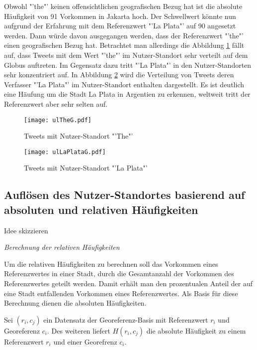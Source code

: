 			Obwohl "'the"' keinen offensichtlichen geografischen Bezug hat ist die absolute Häufigkeit von 91 Vorkommen in Jakarta hoch.
			Der Schwellwert könnte nun aufgrund der Erfahrung mit dem Referenzwert "'La Plata"' auf 90 angesetzt werden.
			Dann würde davon ausgegangen werden, dass der Referenzwert "'the"' einen geografischen Bezug hat.
			Betrachtet man allerdings die Abbildung \ref{img:ULThe} fällt auf, dass Tweets mit dem Wert "'the"' im Nutzer-Standort sehr verteilt auf dem Globus auftreten.
			Im Gegensatz dazu tritt "'La Plata"' in den Nutzer-Standorten sehr konzentriert auf.
			In Abbildung \ref{img:ULlaPlata} wird die Verteilung von Tweets deren Verfasser "'La Plata"' im Nutzer-Standort enthalten dargestellt. 
			Es ist deutlich eine Häufung um die Stadt La Plata in Argentien zu erkennen, weltweit tritt der Referenzwert aber sehr selten auf.
			\begin{figure} 
				\begin{center}
					\texttt{[image: ulTheG.pdf]}
					\caption{Tweets mit Nutzer-Standort "'The"'}
					\label{img:ULThe}
					\end{center}
				\end{figure}
			\begin{figure}
			\begin{center}
					\texttt{[image: ulLaPlataG.pdf]}
					\caption{Tweets mit Nutzer-Standort "'La Plata"'}
					\label{img:ULlaPlata}
				\end{center}
			\end{figure}		

		\subsection{Auflösen des Nutzer-Standortes basierend auf absoluten und relativen Häufigkeiten} 

			Idee skizzieren

			\textit{Berechnung der relativen Häufigkeiten}  

				Um die relativen Häufigkeiten zu berechnen soll das Vorkommen eines Referenzwertes in einer Stadt, durch die Gesamtanzahl der Vorkommen des Referenzwertes geteilt werden.
				Damit erhält man den prozentualen Anteil der auf eine Stadt entfallenden Vorkommen eines Referenzwertes.
				Als Basis für diese Berechnung dienen die absoluten Häufigkeiten.

				Sei $(r_i,c_j)$ ein Datensatz der Georeferenz-Basis mit Referenzwert $r_i$ und Georeferenz $c_i$.
				Des weiteren liefert $H(r_{i},c_{j})$ die absolute Häufigkeit zu einem Referenzwert $r_i$ und einer Georefrenz $c_i$. 

